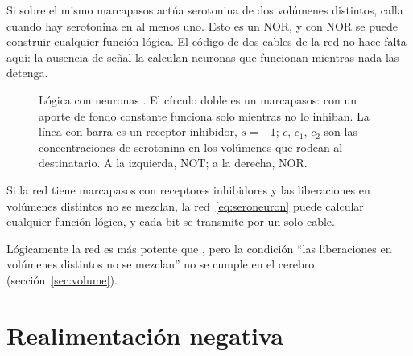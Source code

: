 Si sobre el mismo marcapasos actúa serotonina de dos volúmenes distintos, calla cuando hay serotonina en al menos uno. Esto es un NOR, y con NOR se puede construir cualquier función lógica. El código de dos cables de la red  no hace falta aquí: la ausencia de señal la calculan neuronas que funcionan mientras nada las detenga.

\begin{figure}[t]
\centering
{}
\caption{Lógica con neuronas . El círculo doble es un marcapasos: con un aporte de fondo constante funciona solo mientras no lo inhiban. La línea con barra es un receptor inhibidor, $s=-1$; $c$, $c_1$, $c_2$ son las concentraciones de serotonina en los volúmenes que rodean al destinatario. A la izquierda, NOT; a la derecha, NOR.}
\label{fig:serogates}
\end{figure}

\begin{keyblock}
\begin{proposition}
\label{prop:serocomplete}
Si la red tiene marcapasos con receptores inhibidores y las liberaciones en volúmenes distintos no se mezclan, la red~\eqref{eq:seroneuron} puede calcular cualquier función lógica, y cada bit se transmite por un solo cable.
\end{proposition}
\end{keyblock}

Lógicamente la red  es más potente que , pero la condición “las liberaciones en volúmenes distintos no se mezclan” no se cumple en el cerebro (sección~\ref{sec:volume}).

\section{Realimentación negativa}

